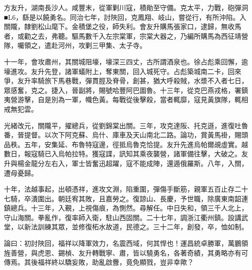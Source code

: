 \begin{pinyinscope}
方友升，湖南長沙人。咸豐末，從軍剿川寇，積勛至守備。克太平，力戰，砲彈洞■L6，繇是以饒勇名。同治七年，討陜回，克鳳翔、岐山，嘗從行，有所沖陷。入關隴，隸劉松山麾下。金積堡之役，師失利。會友升購馬張家口，逮歸，無收馬者，或勸之去，弗聽。驅馬數千入左宗棠軍，宗棠大器之，乃編所購馬為西征靖營隊，囑領之，遣赴河州，攻剿三甲集、太子寺。

十一年，會攻肅州，其關城阻壕，壕深三四丈，古所謂酒泉也。徐占彪乘回懈，逾壕進攻。友升先登，諸軍蟻附上，奪東關，回入城死守。占彪築城南二卡，回來爭，友升率騎旅下馬巷戰，彈貫脛及脊骨，創甚，猶大呼殺賊，水漿不入者七日，眾感奮，克之。捷入，晉副將，賜號哈豐阿巴圖魯。十三年，從克巴燕戎格，署鎮夷營游擊，自是別為一軍，幟色黃。每戰從後擊殺，當者輒靡，寇見黃旗隊，輒相戒無犯雲。

光緒改元，關隴平，擢總兵，從劉錦棠出關。三年，攻克達阪、托克遜，進復吐魯番，晉提督。以次下阿克蘇、烏什、庫車及天山南北二路。論功，賞黃馬褂，賜頭品秩。五年，安集延、布魯特寇邊，徑抵烏魯克恰提。友升先進烏帕爾覘虛實。越數日，報寇騎已入烏帕拉特。獲寇諜，訊知其乘夜襲營，諸軍備往擊，大破之。友升與楊金龍分左右入，軍士皆奮迅超躍，寇不能成陣，還遁俄羅斯。八年，入關，遭母憂歸。

十年，法越事起，出頓憑祥，進攻文淵，陷重圍，彈傷手斷筋，親軍五百止存二十七騎，卒潰圍出。朝廷宥其敗，且嘉勞之。復諒山、長慶，予世職，除廣東南韶連鎮總兵。十三年，入覲，上視傷痕，為惻然。尋解任。中日失和，領三千人北上，守山海關。拳亂作，復率師入衛，駐山西固關。二十七年，調浙江衢州鎮。設講武堂，以新法訓練其眾，並修復柘水故道，民德之。三十二年，創發，卒，恤如制。

論曰：初討陜回，福祥以降軍效力，名震西域，何其悍也！運昌統卓勝軍，萬鵬領旌善營，與虎恩、錫楨、友升轉戰寧、肅，皆以驍勇名，各著奇績，其勇略亦有可傳焉。其後福祥終以驕妄敗，助亂啟釁，竟免顯戮，豈非幸歟？


\end{pinyinscope}